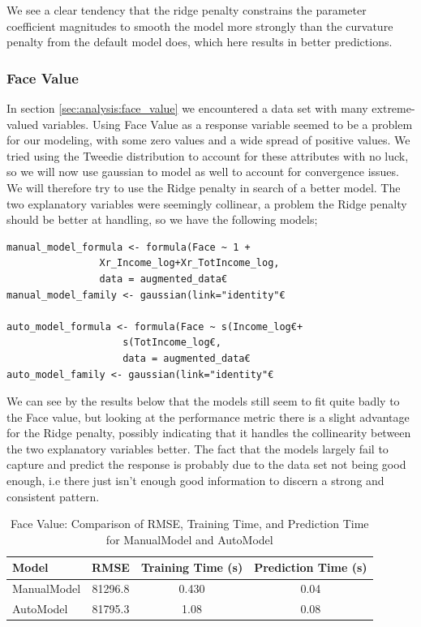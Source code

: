 \documentclass[12pt, twoside,hidelinks]{article}
\theoremstyle{definition}
\numberwithin{equation}{section}
\begin{document}
We see a clear tendency that the ridge penalty constrains the parameter coefficient magnitudes to smooth the model more strongly than the curvature penalty from the default model does, which here results in better predictions. 

\subsubsection{Face Value}

In section \ref{sec:analysis:face_value} we encountered a data set with many extreme-valued variables. Using Face Value as a response variable seemed to be a problem for our modeling, with some zero values and a wide spread of positive values. We tried using the Tweedie distribution to account for these attributes with no luck, so we will now use gaussian to model as well to account for convergence issues. We will therefore try to use the Ridge penalty in search of a better model. The two explanatory variables were seemingly collinear, a problem the Ridge penalty should be better at handling, so we have the following models;


\begin{lstlisting}
manual_model_formula <- formula(Face ~ 1 +
                Xr_Income_log+Xr_TotIncome_log,
                data = augmented_data€
manual_model_family <- gaussian(link="identity"€

auto_model_formula <- formula(Face ~ s(Income_log€+
                    s(TotIncome_log€, 
                    data = augmented_data€
auto_model_family <- gaussian(link="identity"€

\end{lstlisting}

We can see by the results below that the models still seem to fit quite badly to the Face value, but looking at the performance metric there is a slight advantage for the Ridge penalty, possibly indicating that it handles the collinearity between the two explanatory variables better. The fact that the models largely fail to capture and predict the response is probably due to the data set not being good enough, i.e there just isn't enough good information to discern a strong and consistent pattern. 

\newpage



\begin{table}[H]
\centering
\begin{tabular}{lccc}
\toprule
\textbf{Model} & \textbf{RMSE} & \textbf{Training Time (s)} & \textbf{Prediction Time (s)} \\
\midrule
ManualModel & 81296.8 & 0.430 & 0.04 \\
AutoModel   & 81795.3 & 1.08 & 0.08 \\
\bottomrule
\end{tabular}
\caption{Face Value: Comparison of RMSE, Training Time, and Prediction Time for ManualModel and AutoModel}
\label{tab:Facemodel_comparison}
\end{table}
\end{document}
